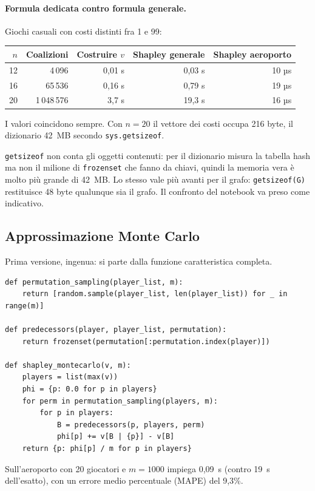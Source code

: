 \paragraph{Formula dedicata contro formula generale.}
Giochi casuali con costi distinti fra 1 e 99:
\begin{center}
\renewcommand{\arraystretch}{1.2}
\begin{tabular}{rrrrr}
\toprule
$n$ & Coalizioni & Costruire $v$ & Shapley generale & Shapley aeroporto \\
\midrule
12 & 4\,096      & 0,01 s & 0,03 s  & 10 µs \\
16 & 65\,536     & 0,16 s & 0,79 s  & 19 µs \\
20 & 1\,048\,576 & 3,7 s  & 19,3 s  & 16 µs \\
\bottomrule
\end{tabular}
\end{center}
I valori coincidono sempre. Con $n = 20$ il vettore dei costi occupa 216 byte, il
dizionario 42~MB secondo \texttt{sys.getsizeof}.

\begin{attenzione}
\texttt{getsizeof} non conta gli oggetti contenuti: per il dizionario misura la tabella hash
ma non il milione di \texttt{frozenset} che fanno da chiavi, quindi la memoria vera è molto
più grande di 42~MB. Lo stesso vale più avanti per il grafo: \texttt{getsizeof(G)}
restituisce 48 byte qualunque sia il grafo. Il confronto del notebook va preso come
indicativo.
\end{attenzione}

\subsection{Approssimazione Monte Carlo}

Prima versione, ingenua: si parte dalla funzione caratteristica completa.
\begin{lstlisting}
def permutation_sampling(player_list, m):
    return [random.sample(player_list, len(player_list)) for _ in range(m)]

def predecessors(player, player_list, permutation):
    return frozenset(permutation[:permutation.index(player)])

def shapley_montecarlo(v, m):
    players = list(max(v))
    phi = {p: 0.0 for p in players}
    for perm in permutation_sampling(players, m):
        for p in players:
            B = predecessors(p, players, perm)
            phi[p] += v[B | {p}] - v[B]
    return {p: phi[p] / m for p in players}
\end{lstlisting}
Sull'aeroporto con 20 giocatori e $m = 1000$ impiega 0,09~s (contro 19~s dell'esatto), con
un errore medio percentuale (MAPE) del 9{,}3\%.

